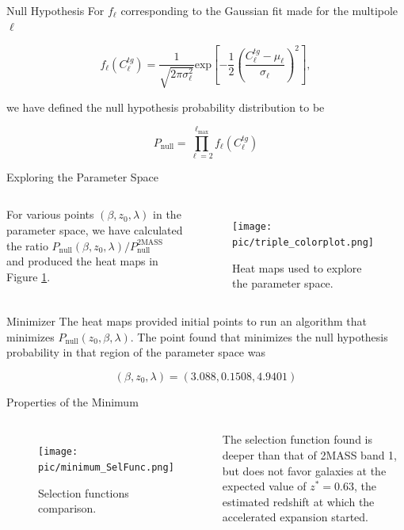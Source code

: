 \documentclass[serif, aspectratio=169]{beamer}
\begin{document}
\begin{frame}{Null Hypothesis}
    For $f_\ell$ corresponding to the Gaussian fit made for the multipole $\ell$

    \begin{equation}
        f_\ell(C_\ell^{tg})=\frac{1}{\sqrt{2\pi \sigma_\ell^2}}\text{exp}\left[-\frac{1}{2}\left(\frac{C_\ell^{tg}-\mu_\ell}{\sigma_\ell}\right)^2\right],
    \end{equation}

    we have defined the null hypothesis probability distribution to be

    \begin{equation}
        P_\text{null}=\prod_{\ell=2}^{\ell_\text{max}} f_\ell(C_\ell^{tg})
    \end{equation}
\end{frame}

\begin{frame}{Exploring the Parameter Space}
    \begin{columns}
        For various points $(\beta, z_0, \lambda)$ in the parameter space, we have calculated the ratio $P_\text{null}(\beta, z_0, \lambda)/P_\text{null}^\text{2MASS}$ and produced the heat maps in Figure \ref{fig:HeatMaps}. 

    \begin{figure}
        \centering
        \texttt{[image: pic/triple\_colorplot.png]}
        \caption{Heat maps used to explore the parameter space.}
        \label{fig:HeatMaps}
    \end{figure}
    \end{columns}
\end{frame}

\begin{frame}{Minimizer}
    The heat maps provided initial points to run an algorithm that minimizes $P_\text{null}(z_0,\beta, \lambda)$. The point found that minimizes the null hypothesis probability in that region of the parameter space was

    \begin{equation}
        (\beta, z_0, \lambda)=(3.088, 0.1508, 4.9401)
    \end{equation}
\end{frame}

\begin{frame}{Properties of the Minimum}
\begin{columns}
    \begin{figure}
        \centering
        \texttt{[image: pic/minimum\_SelFunc.png]}
        \caption{Selection functions comparison.}
        \label{fig:minimum_SelFunc}
    \end{figure}
    The selection function found is deeper than that of 2MASS band 1, but does not favor galaxies at the expected value of $z^*=0.63$, the estimated redshift at which the accelerated expansion started.
\end{columns}
\end{frame}
\end{document}
